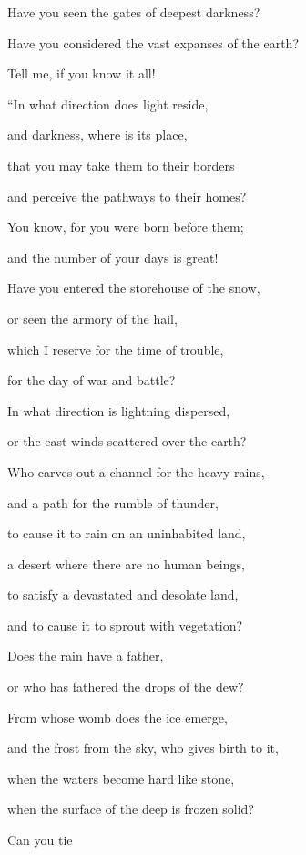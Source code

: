 {\par }{\Q Have you seen
the gates
of deepest darkness?
\par }{\Q {}Have you considered the vast expanses
of the earth?
\par }{\Q Tell
me, if
you know
it all!
\par }{\Q {}“In what direction
does light
reside,
\par }{\Q and darkness,
where
is
its place,
\par }{\Q {}that
you may take
them to
their borders
\par }{\Q and perceive
the pathways
to their homes?
\par }{\Q {}You know,
for
you were born
before
them;

\par }{\Q and the number
of your days
is great!
\par }{\Q {}Have you entered
the storehouse
of the snow,
\par }{\Q or seen
the armory
of the hail,
\par }{\Q {}which
I reserve
for the time
of trouble,
\par }{\Q for
the day
of war
and battle?
\par }{\Q {}In what direction
is
lightning
dispersed,
\par }{\Q or the east winds
scattered
over
the earth?
\par }{\Q {}Who
carves
out a channel
for the heavy rains,
\par }{\Q and a path
for the rumble
of thunder,
\par }{\Q {}to cause it to rain
on
an uninhabited land,
\par }{\Q a desert
where there are no
human
beings,
\par }{\Q {}to satisfy
a devastated
and desolate
land,
\par }{\Q and to cause it to sprout
with vegetation?
\par }{\Q {}Does
the rain
have a father,
\par }{\Q or
who
has fathered
the drops
of the dew?
\par }{\Q {}From whose
womb
does the ice
emerge,
\par }{\Q and the frost
from the sky,
who
gives birth to it,
\par }{\Q {}when the waters
become hard
like stone,
\par }{\Q when the surface
of the deep
is frozen
solid?
\par }{\Q {}Can you tie
}
